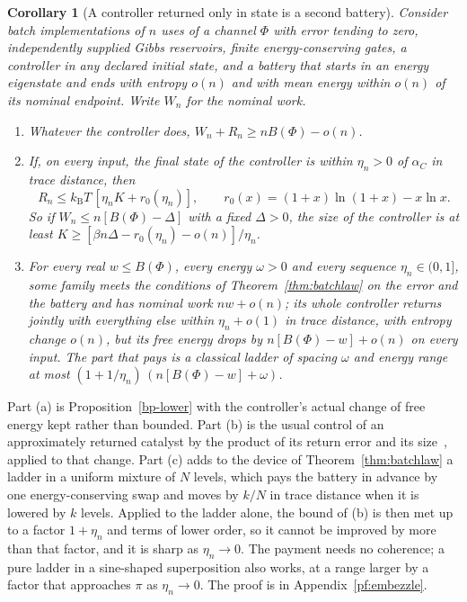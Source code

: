 \documentclass[11pt]{article}
\newtheorem{corollary}[theorem]{Corollary}
\theoremstyle{definition}
\theoremstyle{remark}
\newcommand{\kB}{k_{\mathrm B}}
\begin{document}
\begin{corollary}[A controller returned only in state is a second battery]\label{cor:embezzle}
Consider batch implementations of $n$ uses of a channel $\Phi$ with error tending to zero, independently supplied Gibbs reservoirs, finite energy-conserving gates, a controller in any declared initial state, and a battery that starts in an energy eigenstate and ends with entropy $o(n)$ and with mean energy within $o(n)$ of its nominal endpoint. Write $W_n$ for the nominal work.
\begin{enumerate}[label=(\alph*)]
\item Whatever the controller does, $W_n+R_n\ge nB(\Phi)-o(n)$.
\item If, on every input, the final state of the controller is within $\eta_n>0$ of $\alpha_C$ in trace distance, then
\[
R_n\le\kB T\,[\eta_nK+r_0(\eta_n)],\qquad r_0(x)=(1+x)\ln(1+x)-x\ln x.
\]
So if $W_n\le n[B(\Phi)-\Delta]$ with a fixed $\Delta>0$, the size of the controller is at least $K\ge[\beta n\Delta-r_0(\eta_n)-o(n)]/\eta_n$.
\item For every real $w\le B(\Phi)$, every energy $\omega>0$ and every sequence $\eta_n\in(0,1]$, some family meets the conditions of Theorem~\ref{thm:batchlaw} on the error and the battery and has nominal work $nw+o(n)$; its whole controller returns jointly with everything else within $\eta_n+o(1)$ in trace distance, with entropy change $o(n)$, but its free energy drops by $n[B(\Phi)-w]+o(n)$ on every input. The part that pays is a classical ladder of spacing $\omega$ and energy range at most $(1+1/\eta_n)\,(n[B(\Phi)-w]+\omega)$.
\end{enumerate}
\end{corollary}

Part (a) is Proposition~\ref{bp-lower} with the controller's actual change of free energy kept rather than bounded. Part (b) is the usual control of an approximately returned catalyst by the product of its return error and its size~\cite{BrandaoSecondLaws15,NgCatalysis15}, applied to that change. Part (c) adds to the device of Theorem~\ref{thm:batchlaw} a ladder in a uniform mixture of $N$ levels, which pays the battery in advance by one energy-conserving swap and moves by $k/N$ in trace distance when it is lowered by $k$ levels. Applied to the ladder alone, the bound of (b) is then met up to a factor $1+\eta_n$ and terms of lower order, so it cannot be improved by more than that factor, and it is sharp as $\eta_n\to0$. The payment needs no coherence; a pure ladder in a sine-shaped superposition also works, at a range larger by a factor that approaches $\pi$ as $\eta_n\to0$. The proof is in Appendix~\ref{pf:embezzle}.
\end{document}
